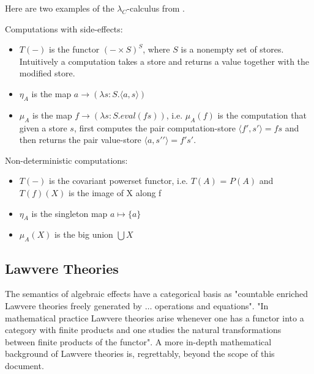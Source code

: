Here are two examples of the $\lambda_C$-calculus from
\cite{moggi1989computational}\cite{moggi1991notions}.
\vspace{5mm}

\begin{example}\label{lc1}
\end{example}
    Computations with side-effects:
    \begin{itemize}
        \item $T(-)$ is the functor $(-\times S)^S$, where $S$ is a nonempty set of stores.
            Intuitively a computation takes a store and returns a value together with the modified store.
        \item $\eta_A$ is the map $a \rightarrow (\lambda s:S.\langle a,s \rangle)$
        \item $\mu_A$ is the map $f \rightarrow (\lambda s:S.eval(fs))$,
            i.e. $\mu_A(f)$ is the computation that given a store $s$,
            first computes the pair computation-store $\langle f\prime,s\prime\rangle = fs$
            and then returns the pair value-store $\langle a,s\prime\prime\rangle = f\prime s\prime$.
    \end{itemize}
\vspace{5mm}

\begin{example}\label{lc2}
    Non-deterministic computations:
    \begin{itemize}
        \item $T(-)$ is the covariant powerset functor,
            i.e.  $T(A)$ = $P(A)$ and $T(f)(X)$ is the image of X along f
        \item $\eta_A$ is the singleton map $a \mapsto  \{a\}$
        \item $\mu_A(X)$ is the big union $\bigcup X$
    \end{itemize}
\end{example}

\subsection{Lawvere Theories}
The semantics of algebraic effects have a categorical basis as
"countable enriched Lawvere theories freely generated by $\dots$ operations and equations".
\cite{plotkin2004computational}
"In mathematical practice Lawvere theories arise
whenever one has a functor into a category with finite products
and one studies the natural transformations between finite products of the functor".
\cite{hyland2007category}
A more in-depth mathematical background of Lawvere theories is, regrettably,
beyond the scope of this document.

